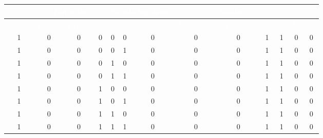 \documentclass[12pt, letterpaper]{article}
\begin{document}
\begin{table}[H]
\renewcommand{\arraystretch}{1.2}
\begin{center}
    \begin{tabular}{|ccc|ccc|ccc|cccc|}
    \hline
    \rowcolor{black!80}
    \multicolumn{3}{|c|}{\textcolor{white}{\textbf{Estado Actual}}} & \multicolumn{3}{c|}{\textcolor{white}{\textbf{Entradas}}} & \multicolumn{3}{c|}{\textcolor{white}{\textbf{Estado Siguiente}}} & \multicolumn{4}{c|}{\textcolor{white}{\textbf{Salidas}}} \\
    \hline
    \rowcolor{black!80}
    \textcolor{white}{\textbf{$P_2(t)$}} & \textcolor{white}{\textbf{$P_1(t)$}} & \textcolor{white}{\textbf{$P_0(t)$}} & \textcolor{white}{\textbf{$X$}} & \textcolor{white}{\textbf{$Y$}} & \textcolor{white}{\textbf{$Z$}} & \textcolor{white}{\textbf{$L_2(t+1)$}} & \textcolor{white}{\textbf{$L_1(t+1)$}} & \textcolor{white}{\textbf{$L_0(t+1)$}} & \textcolor{white}{\textbf{$S_1$}} & \textcolor{white}{\textbf{$S_0$}} & \textcolor{white}{\textbf{$\overline{U_1}$}} & \textcolor{white}{\textbf{$\overline{U_0}$}} \\
    \hline
    1 & 0 & 0 & 0 & 0 & 0 & 0 & 0 & 0 & \cellcolor{ForestGreen!90}1 & \cellcolor{ForestGreen!90}1 & \cellcolor{ForestGreen!90}0 & \cellcolor{ForestGreen!90}0 \\
    1 & 0 & 0 & 0 & 0 & 1 & 0 & 0 & 0 & \cellcolor{ForestGreen!90}1 & \cellcolor{ForestGreen!90}1 & \cellcolor{ForestGreen!90}0 & \cellcolor{ForestGreen!90}0 \\
    1 & 0 & 0 & 0 & 1 & 0 & 0 & 0 & 0 & \cellcolor{ForestGreen!90}1 & \cellcolor{ForestGreen!90}1 & \cellcolor{ForestGreen!90}0 & \cellcolor{ForestGreen!90}0 \\
    1 & 0 & 0 & 0 & 1 & 1 & 0 & 0 & 0 & \cellcolor{ForestGreen!90}1 & \cellcolor{ForestGreen!90}1 & \cellcolor{ForestGreen!90}0 & \cellcolor{ForestGreen!90}0 \\
    1 & 0 & 0 & 1 & 0 & 0 & 0 & 0 & 0 & \cellcolor{ForestGreen!90}1 & \cellcolor{ForestGreen!90}1 & \cellcolor{ForestGreen!90}0 & \cellcolor{ForestGreen!90}0 \\
    1 & 0 & 0 & 1 & 0 & 1 & 0 & 0 & 0 & \cellcolor{ForestGreen!90}1 & \cellcolor{ForestGreen!90}1 & \cellcolor{ForestGreen!90}0 & \cellcolor{ForestGreen!90}0 \\
    1 & 0 & 0 & 1 & 1 & 0 & 0 & 0 & 0 & \cellcolor{ForestGreen!90}1 & \cellcolor{ForestGreen!90}1 & \cellcolor{ForestGreen!90}0 & \cellcolor{ForestGreen!90}0 \\
    1 & 0 & 0 & 1 & 1 & 1 & 0 & 0 & 0 & \cellcolor{ForestGreen!90}1 & \cellcolor{ForestGreen!90}1 & \cellcolor{ForestGreen!90}0 & \cellcolor{ForestGreen!90}0 \\

\end{tabular}
\end{center}
\end{table}
\end{document}
